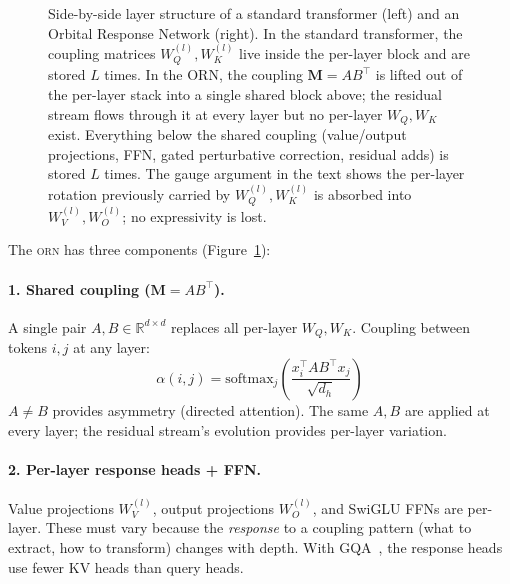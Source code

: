 \documentclass[10pt,twocolumn]{article}
\newcommand{\M}{\mathbf{M}}
\newcommand{\R}{\mathbb{R}}
\newcommand{\orn}{\textsc{orn}}
\begin{document}
\begin{figure}[t]
\caption{Side-by-side layer structure of a standard transformer (left) and an Orbital Response Network (right).
In the standard transformer, the coupling matrices $W_Q^{(l)}, W_K^{(l)}$ live inside the per-layer block and are stored $L$ times.
In the ORN, the coupling $\M = A B^\top$ is lifted out of the per-layer stack into a single shared block above; the residual stream flows through it at every layer but no per-layer $W_Q, W_K$ exist.
Everything below the shared coupling (value/output projections, FFN, gated perturbative correction, residual adds) is stored $L$ times.
The gauge argument in the text shows the per-layer rotation previously carried by $W_Q^{(l)}, W_K^{(l)}$ is absorbed into $W_V^{(l)}, W_O^{(l)}$; no expressivity is lost.}
\label{fig:arch}
\end{figure}

The \orn{} has three components (Figure~\ref{fig:arch}):

\paragraph{1. Shared coupling ($\M = AB^\top$).}
A single pair $A, B \in \R^{d \times d}$ replaces all per-layer $W_Q, W_K$.
Coupling between tokens $i, j$ at any layer:
\begin{equation}
\alpha(i,j) = \text{softmax}_j\!\left(\frac{x_i^\top AB^\top x_j}{\sqrt{d_h}}\right)
\end{equation}
$A \neq B$ provides asymmetry (directed attention). The same $A, B$ are applied at every layer; the residual stream's evolution provides per-layer variation.

\paragraph{2. Per-layer response heads + FFN.}
Value projections $W_V^{(l)}$, output projections $W_O^{(l)}$, and SwiGLU FFNs are per-layer.
These must vary because the \emph{response} to a coupling pattern (what to extract, how to transform) changes with depth.
With GQA~\cite{ainslie2023gqa}, the response heads use fewer KV heads than query heads.
\end{document}
